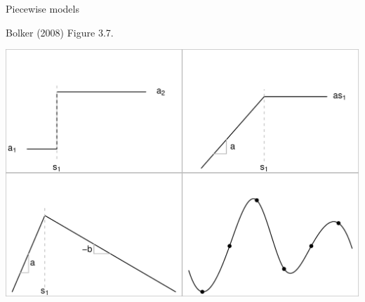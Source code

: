 \documentclass[
  ignorenonframetext,
]{beamer}
\begin{document}
\begin{frame}{Piecewise models}
\protect\hypertarget{piecewise-models}{}

Bolker (2008) Figure 3.7.

\includegraphics{signal_files/figure-beamer/unnamed-chunk-10-1.pdf}

\end{frame}
\end{document}
